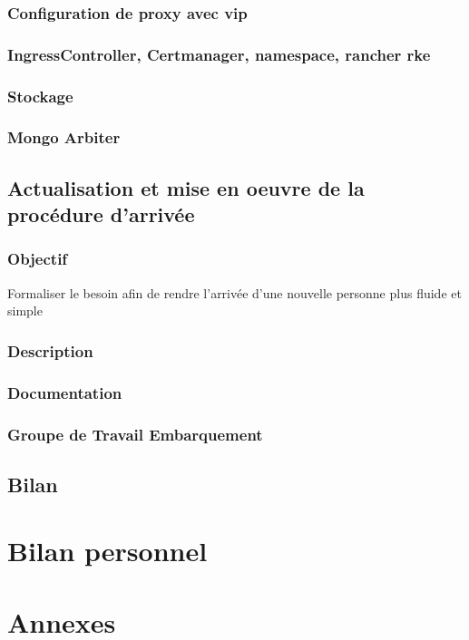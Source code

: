 \documentclass[12pt]{article}
\begin{document}
\subsubsection{Configuration de proxy avec vip}
\subsubsection{IngressController, Certmanager, namespace, rancher rke}
\subsubsection{Stockage}
\subsubsection{Mongo Arbiter}


\newpage
\subsection{Actualisation et mise en oeuvre de la procédure d'arrivée}
\subsubsection{Objectif}
Formaliser le besoin afin de rendre l'arrivée d'une nouvelle personne plus fluide et simple
\subsubsection{Description}
\subsubsection{Documentation}
\subsubsection{Groupe de Travail Embarquement}


\newpage
\subsection{Bilan}

\newpage
\section{Bilan personnel}


\newpage
\section{Annexes}
\end{document}
